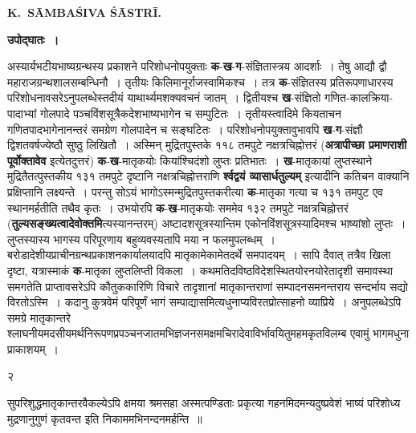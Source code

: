 \documentclass[11pt, openany]{book}
\begin{document}
\hspace{5cm} \textbf{\en K.~SĀMBAŚIVA ŚĀSTRĪ.}

\newpage

\begin{center}
\textbf{उपोद्घातः~।}
\end{center}
\thispagestyle{empty} 
\indent अस्यार्यभटीयभाष्यग्रन्थस्य प्रकाशने परिशोधनोपयुक्ताः \textbf{क}-\textbf{ख}-\textbf{ग}-संज्ञितास्त्रय आदर्शाः~। तेषु आद्यौ द्वौ महाराजग्रन्थशालसम्बन्धिनौ~। तृतीयः किलिमानूर्राजस्वामिकश्च~। तत्र \textbf{क}-संज्ञितस्य प्रतिरूपणाधारस्य परिशोधनावसरेऽनुपलब्धेस्तदीयं याथार्थ्यमशक्यवचनं जातम्~। द्वितीयश्च \textbf{ख}-संज्ञितो गणित-कालक्रिया-पादाभ्यां गोलपादे पञ्चविंशसूत्रैकदेशभाष्यभागेन च सम्पुटितः~। तृतीयस्त्वादिमे कियताचन गणितपादभागेनानन्तरं समग्रेण गोलपादेन च सङ्घटितः~। परिशोधनोपयुक्तावुभावपि \textbf{ख}-\textbf{ग}-संज्ञौ द्विशतवर्षज्येष्ठौ
सुष्ठु लिखितौ~। अस्मिन् मुद्रितपुस्तके ११८ तमपुटे नक्षत्रचिह्नोत्तरं (\textbf{अत्रापीच्छा प्रमाणराशी पूर्वोक्तावेव} इत्येतदुत्तरं) \textbf{क}-\textbf{ख}-मातृकयोः कियांश्चिदंशो लुप्तः प्रतिभातः~। \textbf{ख}-मातृकायां लुप्तस्थाने मुद्रितैतत्पुस्तकीय १३१ तमपुटे दृष्टानि नक्षत्रचिह्नोत्तराणि \textbf{र्श्वद्वयं व्यासार्धतुल्यम्} इत्यादीनि कतिचन वाक्यानि प्रक्षिप्तानि लक्ष्यन्ते~। परन्तु सोऽयं भागोऽस्मन्मुद्रितपुस्तकरीत्या \textbf{क}-मातृका गत्या च १३१ तमपुट एव स्थानमर्हतीति तथैव कृतः~। उभयोरपि \textbf{क}-\textbf{ख}-मातृकयोः सममेव १३२ तमपुटे नक्षत्रचिह्नोत्तरं (\textbf{तुल्यसङ्ख्यत्वादेवोक्तमि}त्यस्यानन्तरम्) अष्टादशसूत्रस्यान्तिम एकोनविंशसूत्रस्यादिमश्च भाष्यांशो लुप्तः~। लुप्तस्यास्य भागस्य परिपूरणाय बहुव्यवस्यतापि मया न फलमुपलब्धम्~। बरोडादेशीयप्राचीनग्रन्थप्रकाशनकार्यालयादपि मातृकामेकामेतदर्थे समपादयम्~। सापि दैवात् तत्रैव खिला दृष्टा, यत्रास्माकं \textbf{क}-मातृका लुप्तलिप्ती विकला~। कथमतिदविष्ठविदेशस्थितयोरनयोरेतादृशी समावस्था समगतेति प्राप्तावसरेऽपि कौतुककारिणि विचारे तादृशानां मातृकान्तराणां सम्पादनसमनन्तराय सन्दर्भाय सद्यो विरतोऽस्मि~। कदानु कुत्रवेमं परिपूर्णं भागं सम्पाद्यासमित्यधुनाप्यविरतप्रोत्साहनो व्याप्रिये~। अनुपलब्धेऽपि समग्रे मातृकान्तरे श्लाघनीयमदसीयमर्थनिरूपणप्रपञ्चनजातमभिज्ञजनसमक्षमचिरादेवाविर्भावयितुमहमकृतविलम्ब एवामुं भागमधुना प्राकाशयम्~।

\newpage

\begin{center} 
	२ 
\end{center}
\thispagestyle{empty} 
\indent सुपरिशुद्धमातृकान्तरवैकल्येऽपि क्षमया श्रमसहा अस्मत्पण्डिताः प्रकृत्या गहनमिदमन्यदुष्प्रवेशं भाष्यं परिशोध्य मुद्रणानुगुणं कृतवन्त इति निकाममभिनन्दनमर्हन्ति~॥\\
\end{document}
